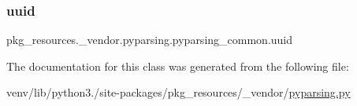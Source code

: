 \subsubsection{\texorpdfstring{uuid}{uuid}}
{\footnotesize\ttfamily pkg\+\_\+resources.\+\_\+vendor.\+pyparsing.\+pyparsing\+\_\+common.\+uuid\hspace{0.3cm}{\ttfamily [static]}}



The documentation for this class was generated from the following file\+:\begin{DoxyCompactItemize}
\item 
venv/lib/python3./site-\/packages/pkg\+\_\+resources/\+\_\+vendor/\hyperlink{pkg__resources_2__vendor_2pyparsing_8py}{pyparsing.\+py}\end{DoxyCompactItemize}
